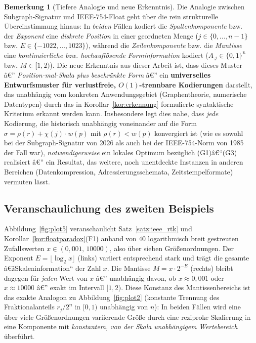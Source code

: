 ﻿\documentclass[a4paper,12pt]{article}
\theoremstyle{definition}
\newtheorem{bemerkung}{Bemerkung}
\begin{document}
\begin{bemerkung}[Tiefere Analogie und neue Erkenntnis]
\label{bem:tiefeanalogie}
	Die Analogie zwischen Subgraph-Signatur und IEEE-754-Float geht über die
	rein strukturelle Übereinstimmung hinaus: In \emph{beiden} Fällen
	kodiert die \emph{Spaltenkomponente} bzw. der \emph{Exponent} eine
	\emph{diskrete Position} in einer geordneten Menge ($j\in\{0,\ldots,n-1\}$
	bzw. $E\in\{-1022,\ldots,1023\}$), während die \emph{Zeilenkomponente}
	bzw. die \emph{Mantisse} eine \emph{kontinuierliche bzw.
	hochauflösende Forminformation} kodiert ($A_{\cdot j}\in\{0,1\}^n$ bzw.
	$M\in[1,2)$). Die neue Erkenntnis aus dieser Arbeit ist, dass dieses
	Muster â€” \emph{Position-mal-Skala plus beschränkte Form} â€” ein
	\textbf{universelles Entwurfsmuster für verlustfreie, $O(1)$-trennbare
	Kodierungen} darstellt, das unabhängig vom konkreten Anwendungsgebiet
	(Graphentheorie, numerische Datentypen) durch das in
	Korollar~\ref{kor:erkennung} formulierte syntaktische Kriterium erkannt
	werden kann. Insbesondere legt dies nahe, dass \emph{jede} Kodierung,
	die historisch unabhängig voneinander auf die Form
	$\sigma=\rho(r)+\chi(j)\cdot w(p)$ mit $\rho(r)<w(p)$ konvergiert ist
	(wie es sowohl bei der Subgraph-Signatur von 2026 als auch bei der
	IEEE-754-Norm von 1985 der Fall war), \emph{notwendigerweise} ein
	lokales Optimum bezüglich (G1)â€“(G3) realisiert â€” ein Resultat, das
	weitere, noch unentdeckte Instanzen in anderen Bereichen
	(Datenkompression, Adressierungsschemata, Zeitstempelformate) vermuten
	lässt.
\end{bemerkung}

\subsection{Veranschaulichung des zweiten Beispiels}

Abbildung~\ref{fig:plot5} veranschaulicht Satz~\ref{satz:ieee_rtk} und
Korollar~\ref{kor:floatparadox}(F1) anhand von $40$ logarithmisch breit
gestreuten Zufallswerten $x\in(0{,}001,\,10000)$, also über sieben
Größenordnungen. Der Exponent $E=\lfloor\log_2 x\rfloor$ (links) variiert
entsprechend stark und trägt die gesamte â€žSkaleninformation`` der Zahl $x$.
Die Mantisse $M=x\cdot2^{-E}$ (rechts) bleibt dagegen für \emph{jeden} Wert
von $x$ â€” unabhängig davon, ob $x\approx0{,}001$ oder $x\approx10000$ â€” exakt
im Intervall $[1,2)$. Diese Konstanz des Mantissenbereichs ist das exakte
Analogon zu Abbildung~\ref{fig:plot2} (konstante Trennung des
Fraktionalanteils $r_j/2^n$ in $[0,1)$ unabhängig von $n$): In beiden Fällen
wird eine über viele Größenordnungen variierende Größe durch eine reziproke
Skalierung in eine Komponente mit \emph{konstantem, von der Skala
unabhängigem Wertebereich} überführt.
\end{document}
